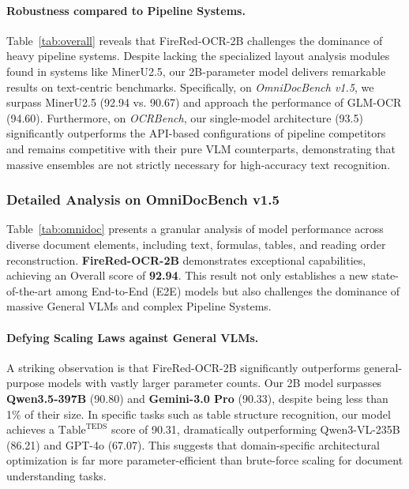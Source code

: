 \paragraph{Robustness compared to Pipeline Systems.}
Table~\ref{tab:overall} reveals that FireRed-OCR-2B challenges the dominance of heavy pipeline systems. Despite lacking the specialized layout analysis modules found in systems like MinerU2.5, our 2B-parameter model delivers remarkable results on text-centric benchmarks. Specifically, on \textit{OmniDocBench v1.5}, we surpass MinerU2.5 (92.94 vs. 90.67) and approach the performance of GLM-OCR (94.60). Furthermore, on \textit{OCRBench}, our single-model architecture (93.5) significantly outperforms the API-based configurations of pipeline competitors and remains competitive with their pure VLM counterparts, demonstrating that massive ensembles are not strictly necessary for high-accuracy text recognition.




\subsubsection{Detailed Analysis on OmniDocBench v1.5}
Table~\ref{tab:omnidoc} presents a granular analysis of model performance across diverse document elements, including text, formulas, tables, and reading order reconstruction. \textbf{FireRed-OCR-2B} demonstrates exceptional capabilities, achieving an Overall score of \textbf{92.94}. This result not only establishes a new state-of-the-art among End-to-End (E2E) models but also challenges the dominance of massive General VLMs and complex Pipeline Systems.

\paragraph{Defying Scaling Laws against General VLMs.}
A striking observation is that FireRed-OCR-2B significantly outperforms general-purpose models with vastly larger parameter counts. Our 2B model surpasses \textbf{Qwen3.5-397B} (90.80) and \textbf{Gemini-3.0 Pro} (90.33), despite being less than 1\% of their size. In specific tasks such as table structure recognition, our model achieves a $\text{Table}^{\text{TEDS}}$ score of 90.31, dramatically outperforming Qwen3-VL-235B (86.21) and GPT-4o (67.07). This suggests that domain-specific architectural optimization is far more parameter-efficient than brute-force scaling for document understanding tasks.

